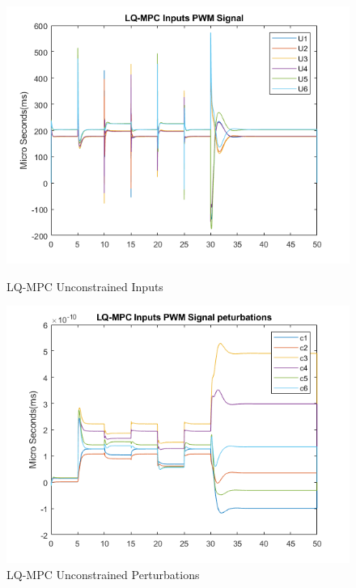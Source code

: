 \documentclass[12pt,a4paper,twoside]{report}
\begin{document}
				\begin{figure}[h!]
					\centering
					\begin{minipage}{0.5\textwidth}
						\centering
						\includegraphics[width=1\textwidth]{LQMPCInputs.png}
						\caption{LQ-MPC Unconstrained Inputs}
						\label{fig:lqmpcunconstrainedinputs}
					\end{minipage}\hfill
					\begin{minipage}{0.5\textwidth}
						\centering
						\includegraphics[width=1\textwidth]{LQMPCPerturbations.png}
						\caption{LQ-MPC Unconstrained Perturbations}
						\label{fig:lqmpcunconstrainedperturbations}
					\end{minipage}
				\end{figure}
			
\end{document}

